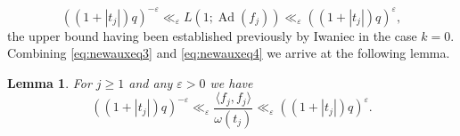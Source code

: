 \documentclass{article}
\newtheorem{lem}[thm]{Lemma}
\theoremstyle{named}
\DeclareMathOperator{\Ad}{Ad}
\begin{document}
\begin{equation}\label{eq:newauxeq4}
    ((1 +|t_j|)q)^{-\varepsilon} \ll_\varepsilon L(1; \Ad(f_j)) \ll_\varepsilon  ((1 +|t_j|)q)^{\varepsilon},
\end{equation}
the upper bound having been established previously by Iwaniec \cite{iwaniecsmalleigenvalues} in the case $k = 0$. Combining \eqref{eq:newauxeq3} and \eqref{eq:newauxeq4} we arrive at the following lemma.
\begin{lem}\label{lem:normnormalizednewform}
For $j \geq 1$ and any $\varepsilon > 0$ we have 
\begin{equation*}
    ((1 +|t_j|)q)^{-\varepsilon} \ll_\varepsilon \frac{\langle f_j, f_j \rangle}{\omega(t_j)} \ll_\varepsilon((1 +|t_j|)q)^{\varepsilon}.
\end{equation*}
\end{lem}
\end{document}
